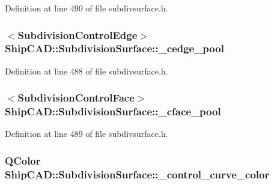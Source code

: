 Definition at line 490 of file subdivsurface.\+h.

\subsubsection[{\texorpdfstring{\+\_\+cedge\+\_\+pool}{_cedge_pool}}]{$<${\bf Subdivision\+Control\+Edge}$>$ Ship\+C\+A\+D\+::\+Subdivision\+Surface\+::\+\_\+cedge\+\_\+pool\hspace{0.3cm}{\ttfamily [protected]}}\hypertarget{classShipCAD_1_1SubdivisionSurface_ad6607443a90f57a3d67a8c6b92c0a46f}{}\label{classShipCAD_1_1SubdivisionSurface_ad6607443a90f57a3d67a8c6b92c0a46f}


Definition at line 488 of file subdivsurface.\+h.

\subsubsection[{\texorpdfstring{\+\_\+cface\+\_\+pool}{_cface_pool}}]{$<${\bf Subdivision\+Control\+Face}$>$ Ship\+C\+A\+D\+::\+Subdivision\+Surface\+::\+\_\+cface\+\_\+pool\hspace{0.3cm}{\ttfamily [protected]}}\hypertarget{classShipCAD_1_1SubdivisionSurface_abdb812e2df0e8f1c80242e7e4f5d709b}{}\label{classShipCAD_1_1SubdivisionSurface_abdb812e2df0e8f1c80242e7e4f5d709b}


Definition at line 489 of file subdivsurface.\+h.

\subsubsection[{\texorpdfstring{\+\_\+control\+\_\+curve\+\_\+color}{_control_curve_color}}]{\setlength{\rightskip}{0pt plus 5cm}Q\+Color Ship\+C\+A\+D\+::\+Subdivision\+Surface\+::\+\_\+control\+\_\+curve\+\_\+color\hspace{0.3cm}{\ttfamily [protected]}}\hypertarget{classShipCAD_1_1SubdivisionSurface_af0385bc183e805c1adc23750747a43d7}{}\label{classShipCAD_1_1SubdivisionSurface_af0385bc183e805c1adc23750747a43d7}


